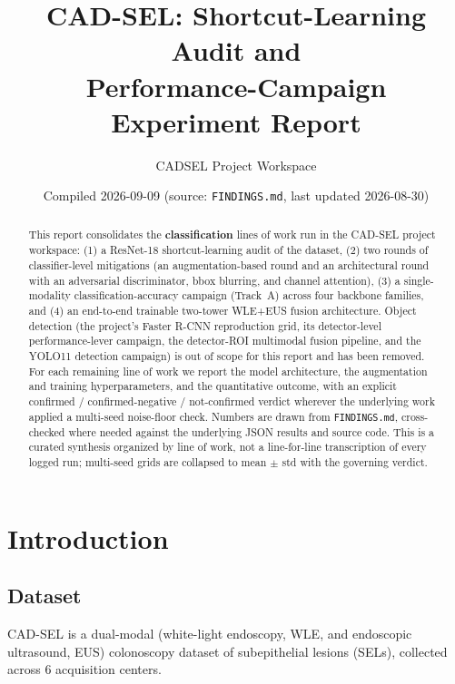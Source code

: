 \documentclass[10pt]{article}
\title{\textbf{CAD-SEL: Shortcut-Learning Audit and \\ Performance-Campaign Experiment Report}}
\author{CADSEL Project Workspace}
\date{Compiled 2026-09-09 \quad (source: \texttt{FINDINGS.md}, last updated 2026-08-30)}
\begin{document}
\maketitle
\thispagestyle{empty}

\begin{abstract}
\noindent This report consolidates the \textbf{classification} lines of work run in the CAD-SEL project
workspace: (1) a ResNet-18 shortcut-learning audit of the dataset, (2) two rounds of classifier-level
mitigations (an augmentation-based round and an architectural round with an adversarial discriminator,
bbox blurring, and channel attention), (3) a single-modality classification-accuracy campaign (Track~A)
across four backbone families, and (4) an end-to-end trainable two-tower WLE+EUS fusion architecture. Object
detection (the project's Faster R-CNN reproduction grid, its detector-level performance-lever campaign, the
detector-ROI multimodal fusion pipeline, and the YOLO11 detection campaign) is out of scope for this report
and has been removed. For each remaining line of work we report the model architecture, the augmentation and
training hyperparameters, and the quantitative outcome, with an explicit confirmed / confirmed-negative /
not-confirmed verdict wherever the underlying work applied a multi-seed noise-floor check. Numbers are drawn
from \texttt{FINDINGS.md}, cross-checked where needed against the underlying JSON results and source code.
This is a curated synthesis organized by line of work, not a line-for-line transcription of every logged
run; multi-seed grids are collapsed to mean $\pm$ std with the governing verdict.
\end{abstract}

\tableofcontents
\clearpage

\section{Introduction}

\subsection{Dataset}

CAD-SEL is a dual-modal (white-light endoscopy, WLE, and endoscopic ultrasound, EUS) colonoscopy dataset
of subepithelial lesions (SELs), collected across 6 acquisition centers.
\end{document}
